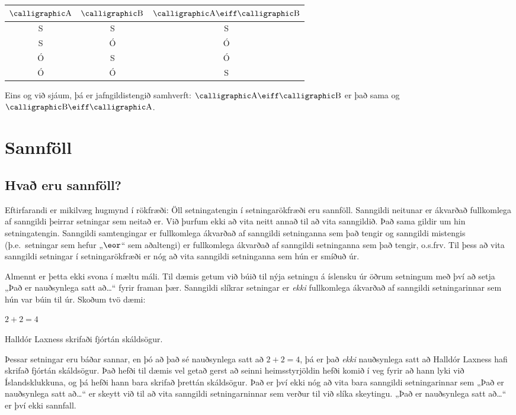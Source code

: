 \begin{center}
\begin{tabular}{c c|c}
$\meta{A}$ & $\meta{B}$ & $\meta{A}\eiff\meta{B}$\\
\hline
S & S & S\\
S & Ó & Ó\\
Ó & S & Ó\\
Ó & Ó & S
\end{tabular}
\end{center}
Eins og við sjáum, þá er jafngildistengið samhverft: $\meta{A} \eiff \meta{B}$ er það sama og $\meta{B}  \eiff \meta{A}$.

\chapter{Sannföll}\label{s:TruthFunctionality}

\section{Hvað eru sannföll?}

Eftirfarandi er mikilvæg hugmynd í rökfræði:
Öll setningatengin í setningarökfræði eru sannföll. Sanngildi neitunar er ákvarðað fullkomlega af sanngildi þeirrar setningar sem neitað er. Við þurfum ekki að vita neitt annað til að vita sanngildið. Það sama gildir um hin setningatengin. Sanngildi samtengingar er fullkomlega ákvarðað af sanngildi setninganna sem það tengir og sanngildi mistengis (þ.e.\ setningar sem hefur „$\eor$“ sem aðaltengi) er fullkomlega ákvarðað af sanngildi setninganna sem það tengir, o.s.frv. Til þess að vita sanngildi setningar í setningarökfræði er nóg að vita sanngildi setninganna sem hún er smíðuð úr.
	
Almennt er þetta ekki svona í mæltu máli. Til dæmis getum við búið til nýja setningu á íslensku úr öðrum setningum með því að setja „Það er nauðsynlega satt að\ldots“ fyrir framan þær. Sanngildi slíkrar setningar er \emph{ekki} fullkomlega ákvarðað af sanngildi setningarinnar sem hún var búin til úr. Skoðum tvö dæmi:
	\begin{earg}
		\item $2 + 2 = 4$
		\item Halldór Laxness skrifaði fjórtán skáldsögur.
	\end{earg}
Þessar setningar eru báðar sannar, en þó að það sé nauðsynlega satt að $2 + 2 = 4$, þá er það \emph{ekki} nauðsynlega satt að Halldór Laxness hafi skrifað fjórtán skáldsögur. Það hefði til dæmis vel getað gerst að seinni heimsstyrjöldin hefði komið í veg fyrir að hann lyki við Íslandsklukkuna, og þá hefði hann bara skrifað þrettán skáldsögur. Það er því ekki nóg að vita bara sanngildi setningarinnar sem „Það er nauðsynlega satt að\ldots“ er skeytt við til að vita sanngildi setningarninnar sem verður til við slíka skeytingu. „Það er nauðsynlega satt að\ldots“ er því ekki sannfall.

